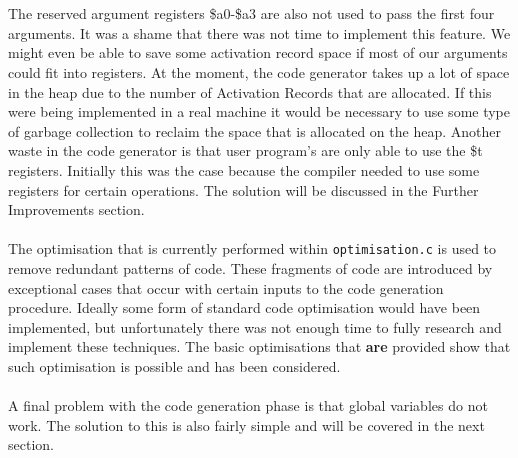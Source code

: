 \ \\ \ \\
The reserved argument registers \$a0-\$a3 are also not used to pass the first four arguments. It was a shame that there was not time to implement this feature. We might even be able to save some activation record space if most of our arguments could fit into registers. At the moment, the code generator takes up a lot of space in the heap due to the number of Activation Records that are allocated. If this were being implemented in a real machine it would be necessary to use some type of garbage collection to reclaim the space that is allocated on the heap. Another waste in the code generator is that user program's are only able to use the \$t registers. Initially this was the case because the compiler needed to use some registers for certain operations. The solution will be discussed in the Further Improvements section.
\ \\ \ \\
The optimisation that is currently performed within \verb!optimisation.c! is used to remove redundant patterns of code. These fragments of code are introduced by exceptional cases that occur with certain inputs to the code generation procedure. Ideally some form of standard code optimisation would have been implemented, but unfortunately there was not enough time to fully research and implement these techniques. The basic optimisations that \textbf{are} provided show that such optimisation is possible and has been considered. 
\ \\ \ \\
A final problem with the code generation phase is that global variables do not work. The solution to this is also fairly simple and will be covered in the next section.

